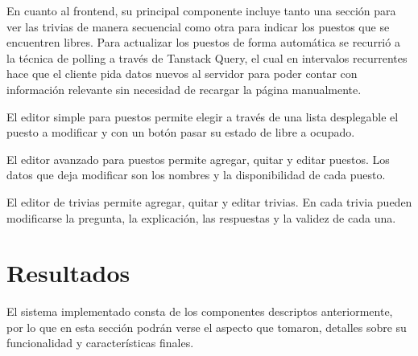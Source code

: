 \documentclass[twoside]{article}
\begin{document}
En cuanto al frontend, su principal componente incluye tanto una sección para ver las trivias de manera secuencial como otra para indicar los puestos que se encuentren libres. Para actualizar los puestos de forma automática se recurrió a la técnica de polling a través de Tanstack Query, el cual en intervalos recurrentes hace que el cliente pida datos nuevos al servidor para poder contar con información relevante sin necesidad de recargar la página manualmente.

El editor simple para puestos permite elegir a través de una lista desplegable el puesto a modificar y con un botón pasar su estado de libre a ocupado.

El editor avanzado para puestos permite agregar, quitar y editar puestos. Los datos que deja modificar son los nombres y la disponibilidad de cada puesto.

El editor de trivias permite agregar, quitar y editar trivias. En cada trivia pueden modificarse la pregunta, la explicación, las respuestas y la validez de cada una.
\section{Resultados}
El sistema implementado consta de los componentes descriptos anteriormente, por lo que en esta sección podrán verse el aspecto que tomaron, detalles sobre su funcionalidad y características finales.
\end{document}
